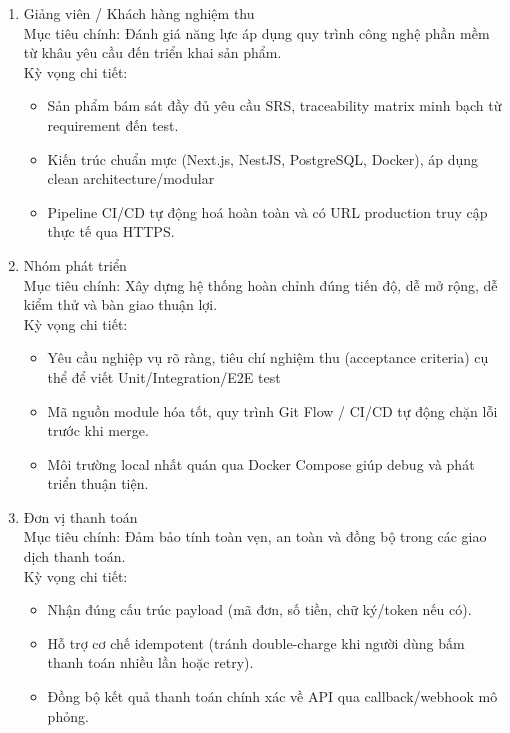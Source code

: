 \documentclass[english,12pt,a4paper]{book}
\begin{document}
\begin{enumerate}
	Kỳ vọng chi tiết:
	\begin{itemize}
		\item Dễ dàng cập nhật menu, giá bán và đánh dấu trạng thái hết hàng tạm thời của món/topping.
		\item Đảm bảo dữ liệu đơn hàng và doanh thu minh bạch, không thất thoát.
		\item Hệ thống vận hành ổn định, giảm tỷ lệ khách hàng rời bỏ do chờ đợi.
	\end{itemize}
	\item Giảng viên / Khách hàng nghiệm thu\\
	
	Mục tiêu chính: Đánh giá năng lực áp dụng quy trình công nghệ phần mềm từ khâu yêu cầu đến triển khai sản phẩm.         \\
	
	Kỳ vọng chi tiết:
	\begin{itemize}
		\item Sản phẩm bám sát đầy đủ yêu cầu SRS, traceability matrix minh bạch từ requirement đến test.   
		\item Kiến trúc chuẩn mực (Next.js, NestJS, PostgreSQL, Docker), áp dụng clean architecture/modular
		\item Pipeline CI/CD tự động hoá hoàn toàn và có URL production truy cập thực tế qua HTTPS.
	\end{itemize}
	\item Nhóm phát triển\\
	
	Mục tiêu chính: Xây dựng hệ thống hoàn chỉnh đúng tiến độ, dễ mở rộng, dễ kiểm thử và bàn giao thuận lợi.\\
	
	Kỳ vọng chi tiết:
	\begin{itemize}
		\item Yêu cầu nghiệp vụ rõ ràng, tiêu chí nghiệm thu (acceptance criteria) cụ thể để viết Unit/Integration/E2E test
		\item  Mã nguồn module hóa tốt, quy trình Git Flow / CI/CD tự động chặn lỗi trước khi merge.   
		\item  Môi trường local nhất quán qua Docker Compose giúp debug và phát triển thuận tiện.
	\end{itemize}
	\item Đơn vị thanh toán\\
	
	Mục tiêu chính: Đảm bảo tính toàn vẹn, an toàn và đồng bộ trong các giao dịch thanh toán.         \\
	
	Kỳ vọng chi tiết:
	\begin{itemize}
		\item Nhận đúng cấu trúc payload (mã đơn, số tiền, chữ ký/token nếu có).
		\item Hỗ trợ cơ chế idempotent (tránh double-charge khi người dùng bấm thanh toán nhiều lần hoặc retry).
		\item  Đồng bộ kết quả thanh toán chính xác về API qua callback/webhook mô phỏng.   
	\end{itemize}
\end{enumerate}
\end{document}
